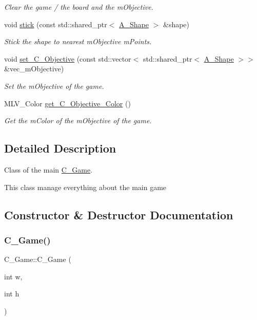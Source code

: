 \begin{DoxyCompactItemize}
\begin{DoxyCompactList}\small\item\em Clear the game / the board and the mObjective. \end{DoxyCompactList}\item
void \hyperlink{classGame_a54ea3746d3738423197219af2d508188}{stick} (const std\+::shared\+\_\+ptr$<$ \hyperlink{classShape}{A_Shape} $>$ \&shape)
\begin{DoxyCompactList}\small\item\em Stick the shape to nearest mObjective mPoints. \end{DoxyCompactList}\item
void \hyperlink{classGame_af8d3ef359625e4179d54f5dd956a0df5}{set\+\_\+\+C_Objective} (const std\+::vector$<$ std\+::shared\+\_\+ptr$<$ \hyperlink{classShape}{A_Shape} $>$$>$ \&vec\+\_\+mObjective)
\begin{DoxyCompactList}\small\item\em Set the mObjective of the game. \end{DoxyCompactList}\item
M\+L\+V\+\_\+\+Color \hyperlink{classGame_ac5de4b11ae90a7ea9182621039fa511c}{get\+\_\+\+C_Objective\+\_\+\+Color} ()
\begin{DoxyCompactList}\small\item\em Get the mColor of the mObjective of the game. \end{DoxyCompactList}\end{DoxyCompactItemize}


\subsection{Detailed Description}
Class of the main \hyperlink{classGame}{C_Game}.

This class manage everything about the main game 

\subsection{Constructor \& Destructor Documentation}
\mbox{\label{classGame_a2b0cb8af7b823a6d595eef9c9641f806}} 
\subsubsection{\texorpdfstring{C_Game()}{C_Game()}}
{\footnotesize\ttfamily C_Game\+::\+C_Game (\begin{DoxyParamCaption}\item[{int}]{w,  }\item[{int}]{h }\end{DoxyParamCaption})}



